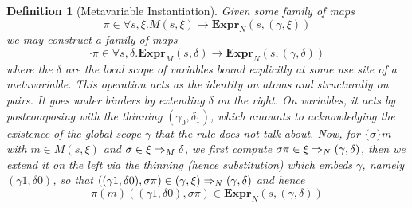 \documentclass[format=acmsmall, screen, review, anonymous, timestamp]{acmart}
\newtheorem{defn}[thm]{Definition}
\begin{document}
\begin{defn}[Metavariable Instantiation]
  Given some family of maps
  \[
    \pi\in\forall s,\xi. M(s,\xi) \to \textbf{Expr}_N(s,(\gamma,\xi))
  \]
  we may construct a family of maps
  \[
    \cdot\pi\in \forall s,\delta. \textbf{Expr}_M(s,\delta)
      \to \textbf{Expr}_N(s,(\gamma,\delta))
    \]
  where the $\delta$ are the local scope of variables bound explicitly
  at some use site of a metavariable.  
  This operation acts as the identity on atoms and structurally on
  pairs. It goes under binders by extending $\delta$ on the right.
  On variables, it acts by postcomposing with the thinning
  $(\gamma_0,\delta_1)$, which amounts to
  acknowledging the existence of the global scope $\gamma$ that the
  rule does not talk about.
  Now, for $\{\sigma\}m$ with $m\in M(s,\xi)$ and
  $\sigma\in \xi\Rightarrow_M\delta$, we first compute
  $\sigma\pi \in \xi\Rightarrow_N(\gamma,\delta)$, then we extend it on the
  left via the thinning (hence substitution) which embeds $\gamma$, namely
  $(\gamma1,\delta0)$, so that
  $((\gamma1,\delta0),\sigma\pi)
    \in (\gamma,\xi)\Rightarrow_N(\gamma,\delta)$
  and hence
  \[
    \pi(m)((\gamma1,\delta0),\sigma\pi)
    \in \textbf{Expr}_N(s,(\gamma,\delta))
    \]
\end{defn}
\end{document}
